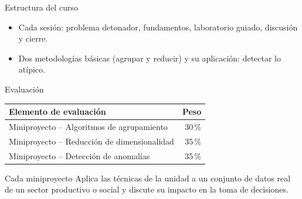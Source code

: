 \documentclass[aspectratio=169,11pt]{beamer}
\begin{document}
\begin{frame}{Estructura del curso}
  \centering
  \vspace{10pt}
  \begin{itemize}
    \item Cada sesión: problema detonador, fundamentos, laboratorio guiado, discusión y cierre.
    \item Dos metodologías básicas (agrupar y reducir) y su aplicación: detectar lo atípico.
  \end{itemize}
\end{frame}

\begin{frame}{Evaluación}
  \centering
  \renewcommand{\arraystretch}{1.3}
  \begin{tabular}{@{}lr@{}}
    \toprule
    \textbf{Elemento de evaluación} & \textbf{Peso}\\
    \midrule
    Miniproyecto -- Algoritmos de agrupamiento & 30\,\% \\
    Miniproyecto -- Reducción de dimensionalidad & 35\,\% \\
    Miniproyecto -- Detección de anomalías & 35\,\% \\
    \bottomrule
  \end{tabular}
  \vspace{8pt}
  \begin{block}{Cada miniproyecto}
    Aplica las técnicas de la unidad a un conjunto de datos real de un sector
    productivo o social y discute su impacto en la toma de decisiones.
  \end{block}
\end{frame}
\end{document}
